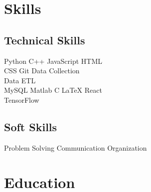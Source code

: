 \documentclass[]{deedy-resume-openfont}
\begin{document}
%
%

%
%

\begin{minipage}[t]{0.33\textwidth} 


\section{Skills}
\subsection{Technical Skills}
Python \textbullet{}   C++ \textbullet{} JavaScript \textbullet{} HTML \\
CSS
\textbullet{} Git \textbullet{}  Data Collection \textbullet{} \\ Data ETL \\
\vspace{3mm} %
MySQL \textbullet{}Matlab \textbullet{} C \textbullet{} \LaTeX \textbullet{} React \\
TensorFlow
\sectionsep

\subsection{Soft Skills}
\vspace{2mm}

Problem Solving \textbullet{} Communication
Organization




\section{Education} 


\end{minipage}
\end{document}
